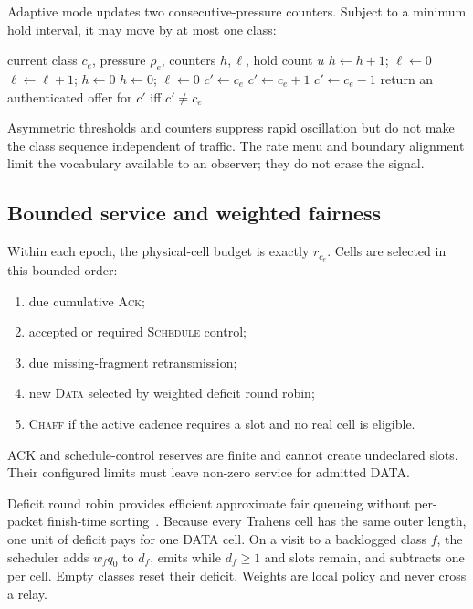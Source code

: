 \documentclass[11pt,oneside]{article}
\begin{document}
Adaptive mode updates two consecutive-pressure counters. Subject to a minimum hold interval, it may move by at most one class:

\begin{algorithm}[ht]
\caption{Quantized adaptive class proposal}
\label{alg:t2adapt}
\begin{algorithmic}[1]
\Require current class $c_e$, pressure $\rho_e$, counters $h,\ell$, hold count $u$
  \State $h\gets h+1$; $\ell\gets0$
  \State $\ell\gets\ell+1$; $h\gets0$
\Else
  \State $h\gets0$; $\ell\gets0$
\EndIf
\State $c'\gets c_e$
  \State $c'\gets c_e+1$
  \State $c'\gets c_e-1$
\EndIf
\State return an authenticated offer for $c'$ iff $c'\ne c_e$
\end{algorithmic}
\end{algorithm}

Asymmetric thresholds and counters suppress rapid oscillation but do not make the class sequence independent of traffic. The rate menu and boundary alignment limit the vocabulary available to an observer; they do not erase the signal.

\subsection{Bounded service and weighted fairness}

Within each epoch, the physical-cell budget is exactly $r_{c_e}$. Cells are selected in this bounded order:
\begin{enumerate}
  \item due cumulative \textsc{Ack};
  \item accepted or required \textsc{Schedule} control;
  \item due missing-fragment retransmission;
  \item new \textsc{Data} selected by weighted deficit round robin;
  \item \textsc{Chaff} if the active cadence requires a slot and no real cell is eligible.
\end{enumerate}
ACK and schedule-control reserves are finite and cannot create undeclared slots. Their configured limits must leave non-zero service for admitted DATA.

Deficit round robin provides efficient approximate fair queueing without per-packet finish-time sorting~\cite{drr}. Because every Trahens cell has the same outer length, one unit of deficit pays for one DATA cell. On a visit to a backlogged class $f$, the scheduler adds $w_fq_0$ to $d_f$, emits while $d_f\ge1$ and slots remain, and subtracts one per cell. Empty classes reset their deficit. Weights are local policy and never cross a relay.
\end{document}
